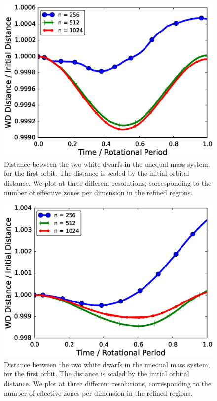 \documentclass[12pt]{article}
\begin{document}
\begin{figure}[h!]
  \centering
  \includegraphics[scale=0.8,trim=0.1in 0.0in 0.1in 0.15in,clip]{plots/spatial_convergence_rot0}
  \caption[Distance between two unequal mass white dwarfs, inertial frame]
          {Distance between the two white dwarfs in the unequal mass system, for the first orbit.
           The distance is scaled by the initial orbital distance.
           We plot at three different resolutions, corresponding to the number of
           effective zones per dimension in the refined regions.
           \label{fig:unequal_spatial_convergence_inertial}}
\end{figure}

\begin{figure}[h!]
  \centering
  \includegraphics[scale=0.8,trim=0.1in 0.0in 0.1in 0.15in,clip]{plots/spatial_convergence_rot1}
  \caption[Distance between two unequal mass white dwarfs, rotating frame]
          {Distance between the two white dwarfs in the unequal mass system, for the first orbit.
           The distance is scaled by the initial orbital distance.
           We plot at three different resolutions, corresponding to the number of
           effective zones per dimension in the refined regions.
           \label{fig:unequal_spatial_convergence_rotating}}
\end{figure}
\end{document}

